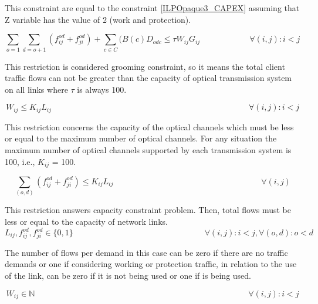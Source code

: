 This constraint are equal to the constraint \ref{ILPOpaque3_CAPEX} assuming that Z variable has the value of 2 (work and protection).

\begin{equation}
\sum_{o=1} \sum_{d=o+1} \left(f_{ij}^{od} + f_{ji}^{od}\right) + \sum_{c\in C} (B\left(c\right) D_{odc}\leq \tau W_{ij} G_{ij} \qquad \qquad \qquad
\forall(i,j) : i < j
\label{ILPOpaque4}
\end{equation}

This restriction is considered grooming constraint, so it means the total client traffic flows can not be greater than the capacity of optical transmission system on all links where $\tau$ is always 100.

\begin{equation}
W_{ij} \leq K_{ij} L_{ij} \qquad \qquad \qquad \qquad \qquad \qquad \qquad \qquad \qquad \qquad \qquad \qquad \forall(i,j) : i < j
\label{ILPOpaque5}
\end{equation}

This restriction concerns the capacity of the optical channels which must be less or equal to the maximum number of optical channels. For any situation the maximum number of optical channels supported by each transmission system is 100, i.e., $K_{ij}$ = 100.

\begin{equation}
\sum_{(o,d)} \left(f_{ij}^{od} + f_{ji}^{od}\right)\leq K_{ij} L_{ij} \qquad \qquad \qquad \qquad \qquad \qquad \qquad \qquad \qquad
\forall (i,j)
\label{ILPOpaqueX}
\end{equation}

This restriction answers capacity constraint problem. Then, total flows must be less or equal to the capacity of network links.
\newpage
\begin{equation}
L_{ij} , f_{ij}^{od} , f_{ji}^{od} \in \{0,1\}   \qquad \qquad \qquad \qquad \qquad \qquad \qquad \qquad
\forall(i,j) : i < j, \forall(o,d) : o < d
\label{ILPOpaque6}
\end{equation}

The number of flows per demand in this case can be zero if there are no traffic demands or one if considering working or protection traffic, in relation to the use of the link, can be zero if it is not being used or one if is being used.

\begin{equation}
W_{ij} \in \mathbb{N}  \qquad \qquad \qquad \qquad \qquad \qquad \qquad \qquad \qquad \qquad \qquad \qquad \qquad
\forall(i,j) : i < j\label{ILPOpaque7}
\end{equation}

